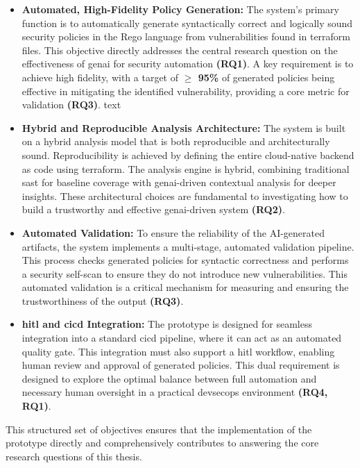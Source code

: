 \begin{itemize}
\item \textbf{Automated, High-Fidelity Policy Generation:} The system's primary function is to automatically generate syntactically correct and logically sound security policies in the Rego language from vulnerabilities found in \gls{terraform} files. This objective directly addresses the central research question on the effectiveness of \gls{genai} for security automation \textbf{(RQ1)}. A key requirement is to achieve high fidelity, with a target of \textbf{$\geq$ 95\%} of generated policies being effective in mitigating the identified vulnerability, providing a core metric for validation \textbf{(RQ3)}.
text
\item \textbf{Hybrid and Reproducible Analysis Architecture:} The system is built on a hybrid analysis model that is both reproducible and architecturally sound. Reproducibility is achieved by defining the entire \gls{cloud-native} backend as code using \gls{terraform}. The analysis engine is hybrid, combining traditional \gls{sast} for baseline coverage with \gls{genai}-driven contextual analysis for deeper insights. These architectural choices are fundamental to investigating how to build a trustworthy and effective \gls{genai}-driven system \textbf{(RQ2)}.

\item \textbf{Automated Validation:} To ensure the reliability of the AI-generated artifacts, the system implements a multi-stage, automated validation pipeline. This process checks generated policies for syntactic correctness and performs a security self-scan to ensure they do not introduce new vulnerabilities. This automated validation is a critical mechanism for measuring and ensuring the trustworthiness of the output \textbf{(RQ3)}.

\item \textbf{\gls{hitl} and \gls{cicd} Integration:} The prototype is designed for seamless integration into a standard \gls{cicd} pipeline, where it can act as an automated quality gate. This integration must also support a \gls{hitl} workflow, enabling human review and approval of generated policies. This dual requirement is designed to explore the optimal balance between full automation and necessary human oversight in a practical \gls{devsecops} environment \textbf{(RQ4, RQ1)}.
\end{itemize}

This structured set of objectives ensures that the implementation of the prototype directly and comprehensively contributes to answering the core research questions of this thesis.

